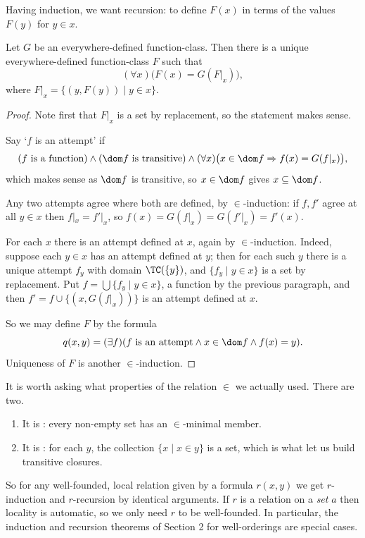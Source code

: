 Having induction, we want recursion: to define $F(x)$ in terms of the values $F(y)$ for $y \in x$.

\begin{theorem}\label{thm:epsilonrecursion}
Let $G$ be an everywhere-defined function-class. Then there is a unique everywhere-defined function-class $F$ such that
$$(\forall x)\bigl(F(x) = G(F|_x)\bigr),$$
where $F|_x = \{(y, F(y)) \mid y \in x\}$.
\end{theorem}
\begin{proof}
  Note first that $F|_x$ is a set by replacement, so the statement makes sense.

  Say `$f$ is an attempt' if
  \begin{align*}
    (f\text{ is a function}) \land (\dom f\text{ is transitive}) \land (\forall x)\bigl(x \in \dom f \Rightarrow f(x) = G(f|_x)\bigr),
  \end{align*}
  which makes sense as $\dom f$ is transitive, so $x \in \dom f$ gives $x \subseteq \dom f$.

  Any two attempts agree where both are defined, by $\in$-induction: if $f, f'$ agree at all $y \in x$ then $f|_x = f'|_x$, so $f(x) = G(f|_x) = G(f'|_x) = f'(x)$.

  For each $x$ there is an attempt defined at $x$, again by $\in$-induction. Indeed, suppose each $y \in x$ has an attempt defined at $y$; then for each such $y$ there is a unique attempt $f_y$ with domain $\TC(\{y\})$, and $\{f_y \mid y \in x\}$ is a set by replacement. Put $f = \bigcup\{f_y \mid y \in x\}$, a function by the previous paragraph, and then $f' = f \cup \{(x, G(f|_x))\}$ is an attempt defined at $x$.

  So we may define $F$ by the formula
  $$q(x, y) = (\exists f)(f \text{ is an attempt} \land x \in \dom f \land f(x) = y).$$
  Uniqueness of $F$ is another $\in$-induction.
\end{proof}

It is worth asking what properties of the relation $\in$ we actually used. There are two.
\begin{enumerate}[label=(\roman*)]
  \item It is : every non-empty set has an $\in$-minimal member.
  \item It is : for each $y$, the collection $\{x \mid x \in y\}$ is a set, which is what let us build transitive closures.
\end{enumerate}
So for any well-founded, local relation given by a formula $r(x,y)$ we get $r$-induction and $r$-recursion by identical arguments. If $r$ is a relation on a \emph{set} $a$ then locality is automatic, so we only need $r$ to be well-founded. In particular, the induction and recursion theorems of Section 2 for well-orderings are special cases.

